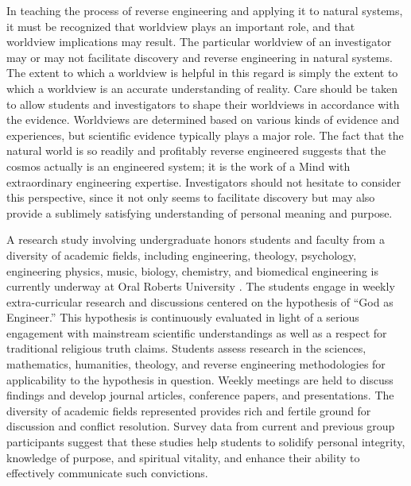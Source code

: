 In teaching the process of reverse engineering and applying it to
natural systems, it must be recognized that worldview plays an
important role, and that worldview implications may result. The
particular worldview of an investigator may or may not facilitate
discovery and reverse engineering in natural systems. The extent to
which a worldview is helpful in this regard is simply the extent to
which a worldview is an accurate understanding of reality. Care should
be taken to allow students and investigators to shape their worldviews
in accordance with the evidence. Worldviews are determined based on
various kinds of evidence and experiences, but scientific evidence
typically plays a major role. The fact that the natural world is so
readily and profitably reverse engineered suggests that the cosmos
actually is an engineered system; it is the work of a Mind with
extraordinary engineering expertise. Investigators should not hesitate
to consider this perspective, since it not only seems to facilitate
discovery but may also provide a sublimely satisfying understanding of
personal meaning and purpose.

A research study involving undergraduate honors students and faculty
from a diversity of academic fields, including engineering, theology,
psychology, engineering physics, music, biology, chemistry, and
biomedical engineering is currently underway at Oral Roberts
University \citep{halsmerbeck2012}. The students engage in weekly
extra-curricular research and discussions centered on the hypothesis of
“God as Engineer.” This hypothesis is continuously evaluated in light
of a serious engagement with mainstream scientific understandings as
well as a respect for traditional religious truth claims. Students
assess research in the sciences, mathematics, humanities, theology, and
reverse engineering methodologies for applicability to the hypothesis
in question. Weekly meetings are held to discuss findings and develop
journal articles, conference papers, and presentations. The diversity of
academic fields represented provides rich and fertile ground for
discussion and conflict resolution. Survey data from current and
previous group participants suggest that these studies help students to
solidify personal integrity, knowledge of purpose, and spiritual
vitality, and enhance their ability to effectively communicate such
convictions.

